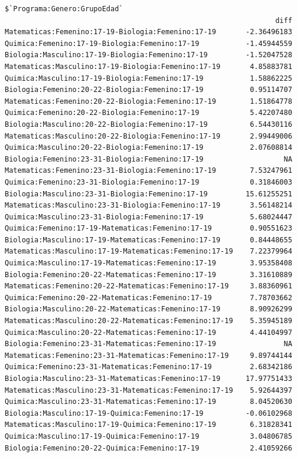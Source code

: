 \documentclass{rapport}
\begin{document}
\begin{itemize}
\begin{verbatim}
$`Programa:Genero:GrupoEdad`
                                                                diff
Matematicas:Femenino:17-19-Biologia:Femenino:17-19       -2.36496183
Quimica:Femenino:17-19-Biologia:Femenino:17-19           -1.45944559
Biologia:Masculino:17-19-Biologia:Femenino:17-19         -1.52047528
Matematicas:Masculino:17-19-Biologia:Femenino:17-19       4.85883781
Quimica:Masculino:17-19-Biologia:Femenino:17-19           1.58862225
Biologia:Femenino:20-22-Biologia:Femenino:17-19           0.95114707
Matematicas:Femenino:20-22-Biologia:Femenino:17-19        1.51864778
Quimica:Femenino:20-22-Biologia:Femenino:17-19            5.42207480
Biologia:Masculino:20-22-Biologia:Femenino:17-19          6.54430116
Matematicas:Masculino:20-22-Biologia:Femenino:17-19       2.99449006
Quimica:Masculino:20-22-Biologia:Femenino:17-19           2.07608814
Biologia:Femenino:23-31-Biologia:Femenino:17-19                   NA
Matematicas:Femenino:23-31-Biologia:Femenino:17-19        7.53247961
Quimica:Femenino:23-31-Biologia:Femenino:17-19            0.31846003
Biologia:Masculino:23-31-Biologia:Femenino:17-19         15.61255251
Matematicas:Masculino:23-31-Biologia:Femenino:17-19       3.56148214
Quimica:Masculino:23-31-Biologia:Femenino:17-19           5.68024447
Quimica:Femenino:17-19-Matematicas:Femenino:17-19         0.90551623
Biologia:Masculino:17-19-Matematicas:Femenino:17-19       0.84448655
Matematicas:Masculino:17-19-Matematicas:Femenino:17-19    7.22379964
Quimica:Masculino:17-19-Matematicas:Femenino:17-19        3.95358408
Biologia:Femenino:20-22-Matematicas:Femenino:17-19        3.31610889
Matematicas:Femenino:20-22-Matematicas:Femenino:17-19     3.88360961
Quimica:Femenino:20-22-Matematicas:Femenino:17-19         7.78703662
Biologia:Masculino:20-22-Matematicas:Femenino:17-19       8.90926299
Matematicas:Masculino:20-22-Matematicas:Femenino:17-19    5.35945189
Quimica:Masculino:20-22-Matematicas:Femenino:17-19        4.44104997
Biologia:Femenino:23-31-Matematicas:Femenino:17-19                NA
Matematicas:Femenino:23-31-Matematicas:Femenino:17-19     9.89744144
Quimica:Femenino:23-31-Matematicas:Femenino:17-19         2.68342186
Biologia:Masculino:23-31-Matematicas:Femenino:17-19      17.97751433
Matematicas:Masculino:23-31-Matematicas:Femenino:17-19    5.92644397
Quimica:Masculino:23-31-Matematicas:Femenino:17-19        8.04520630
Biologia:Masculino:17-19-Quimica:Femenino:17-19          -0.06102968
Matematicas:Masculino:17-19-Quimica:Femenino:17-19        6.31828341
Quimica:Masculino:17-19-Quimica:Femenino:17-19            3.04806785
Biologia:Femenino:20-22-Quimica:Femenino:17-19            2.41059266

\end{verbatim}
\end{itemize}
\end{document}
